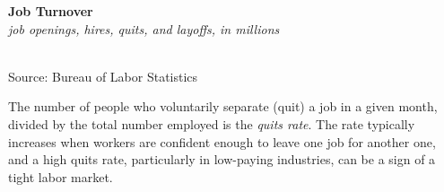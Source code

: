 \documentclass{report}
\makeatletter
\newcommand{\tbllink}[1]{\href{https://raw.githubusercontent.com/bdecon/US-chartbook/master/chartbook/data/#1}{\faTable}}
\newcommand*\short[1]{\expandafter\@gobbletwo\number\numexpr#1\relax}
\newcommand{\stdnode}[3]{\node[below, align=left, shift=({#1,#2})]{#3};}
\newcommand{\dateaxisticks}{
		date coordinates in=x, axis line style={draw=none},
		xmax={2020-05-10},
		max space between ticks=40,	    
		xtick={{1990-01-01}, {1992-01-01}, {1994-01-01}, 
			{1996-01-01}, {1998-01-01}, {2000-01-01}, 
			{2002-01-01}, {2004-01-01}, {2006-01-01},
			{2008-01-01}, {2010-01-01}, {2012-01-01}, {2014-01-01},
		    {2016-01-01}, {2018-01-01}, {2020-01-01}},
		minor xtick={{1989-01-01}, {1991-01-01}, {1993-01-01},
			{1995-01-01}, {1997-01-01}, {1999-01-01}, 
			{2001-01-01}, {2003-01-01}, {2005-01-01}, {2007-01-01},
		    {2009-01-01}, {2011-01-01}, {2013-01-01}, {2015-01-01},
		    {2017-01-01}, {2019-01-01}},
		enlarge y limits={0.06}, enlarge x limits={0.01},
		}
\newcommand{\bbar}[2]{extra #1 ticks = {{#2}}, extra #1 tick labels = ,
		extra #1 tick style = {grid=major, grid style={thick, black!25}},}
\newcommand{\stdline}[4]{\addplot[very thick, no markers, color=#1] 
		table [x=#2, y=#3, col sep=comma] {#4};	}
\newcommand{\rbars}{
		\fill[color=black!10] (axis cs:{1990-07-01},\pgfkeysvalueof{/pgfplots/ymin}) rectangle 
			(axis cs:{1991-03-01}, \pgfkeysvalueof{/pgfplots/ymax});
		\fill[color=black!10] (axis cs:{2007-12-01},\pgfkeysvalueof{/pgfplots/ymin}) rectangle 
			(axis cs:{2009-07-01}, \pgfkeysvalueof{/pgfplots/ymax});
		\fill[color=black!10] (axis cs:{2001-03-01},\pgfkeysvalueof{/pgfplots/ymin}) rectangle 
			(axis cs:{2001-11-01}, \pgfkeysvalueof{/pgfplots/ymax});}
\makeatother
\begin{document}
{{{{{{{{{\begin{minipage}{0.28\textwidth}
\small 
\end{minipage} \hspace{4.5mm}
\begin{minipage}{0.437\textwidth}
\noindent \normalsize \textbf{Job Turnover}\\
\footnotesize{\textit{job openings, hires, quits, and layoffs, in millions}}\\
\noindent \hspace*{-2mm} \\
\footnotesize{Source: Bureau of Labor Statistics} \hfill \tbllink{jolts.csv}
\end{minipage}
\vspace{1mm}

\begin{minipage}{0.76\textwidth}

\small The number of people who voluntarily separate (quit) a job in a given month, divided by the total number employed is the \textit{quits rate}. The rate typically increases when workers are confident enough to leave one job for another one, and a high quits rate, particularly in low-paying industries, can be a sign of a tight labor market.
\end{minipage}
\vspace{1mm}

}}}}}}}}}
\end{document}
